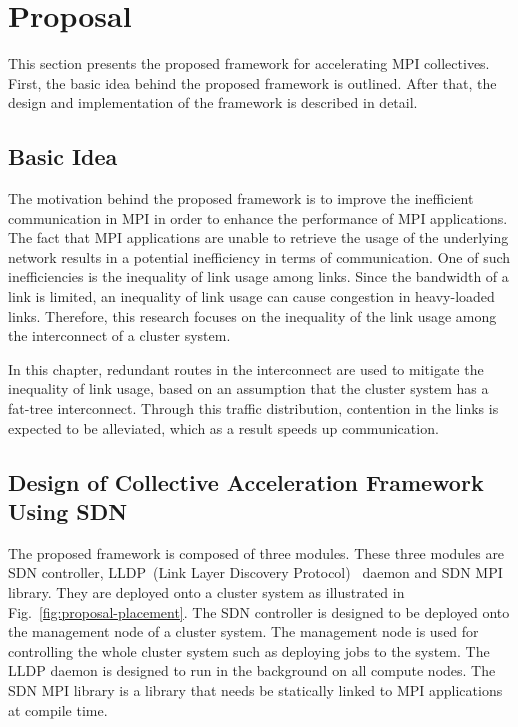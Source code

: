 \section{Proposal}\label{sec:iii-proposal}

This section presents the proposed framework for accelerating MPI collectives.
First, the basic idea behind the proposed framework is outlined. After that,
the design and implementation of the framework is described in detail.

\subsection{Basic Idea}

The motivation behind the proposed framework is to improve the inefficient communication
in MPI in order to enhance the performance of MPI applications. The fact that
MPI applications are unable to retrieve the usage of the underlying network
results in a potential inefficiency in terms of communication. One of such
inefficiencies is the inequality of link usage among links. Since the
bandwidth of a link is limited, an inequality of link usage can cause
congestion in heavy-loaded links. Therefore, this research focuses on the
inequality of the link usage among the interconnect of a cluster system.

In this chapter, redundant routes in the interconnect are used to mitigate the
inequality of link usage, based on an assumption that the cluster system has a
fat-tree interconnect. Through this traffic distribution, contention in the
links is expected to be alleviated, which as a result speeds up communication.

\subsection{Design of Collective Acceleration Framework Using SDN}%
\label{sec:iii-design}

The proposed framework is composed of three modules. These three modules are
SDN controller, LLDP~(Link Layer Discovery Protocol)~\autocite{lldp} daemon
and SDN MPI library. They are deployed onto a cluster system as illustrated in
Fig.~\ref{fig:proposal-placement}. The SDN controller is designed to be
deployed onto the management node of a cluster system. The management node is
used for controlling the whole cluster system such as deploying jobs to the
system. The LLDP daemon is designed to run in the background on all compute
nodes. The SDN MPI library is a library that needs be statically linked to MPI
applications at compile time.

